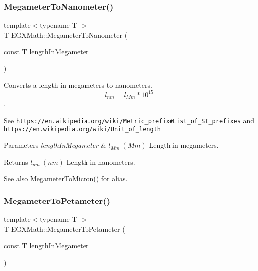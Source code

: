 \subsubsection{\texorpdfstring{Megameter\+To\+Nanometer()}{MegameterToNanometer()}}
{\footnotesize\ttfamily template$<$typename T $>$ \\
T E\+G\+X\+Math\+::\+Megameter\+To\+Nanometer (\begin{DoxyParamCaption}\item[{const T}]{length\+In\+Megameter }\end{DoxyParamCaption})}



Converts a length in megameters to nanometers. \[ l_{nm}=l_{Mm} * 10^{15} \]. 

See \href{https://en.wikipedia.org/wiki/Metric_prefix#List_of_SI_prefixes}{\tt https\+://en.\+wikipedia.\+org/wiki/\+Metric\+\_\+prefix\#\+List\+\_\+of\+\_\+\+S\+I\+\_\+prefixes} and \href{https://en.wikipedia.org/wiki/Unit_of_length}{\tt https\+://en.\+wikipedia.\+org/wiki/\+Unit\+\_\+of\+\_\+length} 
\begin{DoxyParams}{Parameters}
{\em length\+In\+Megameter} & $ l_{Mm}\ (Mm)$ Length in megameters. \\
\hline
\end{DoxyParams}
\begin{DoxyReturn}{Returns}
$ l_{nm}\ (nm)$ Length in nanometers. 
\end{DoxyReturn}
\begin{DoxySeeAlso}{See also}
\mbox{\hyperlink{group___e_g_x_math-_conversions-_length_conversions-_s_i-_megameter-_non-_s_i_ga14e6b356b28257b1bde9cb9ebf6bc3c6}{Megameter\+To\+Micron()}} for alias. 
\end{DoxySeeAlso}
\mbox{\label{group___e_g_x_math-_conversions-_length_conversions-_s_i-_megameter-_s_i_gad40646b8456e092061f26bc6c6c65925}} 
\subsubsection{\texorpdfstring{Megameter\+To\+Petameter()}{MegameterToPetameter()}}
{\footnotesize\ttfamily template$<$typename T $>$ \\
T E\+G\+X\+Math\+::\+Megameter\+To\+Petameter (\begin{DoxyParamCaption}\item[{const T}]{length\+In\+Megameter }\end{DoxyParamCaption})}



